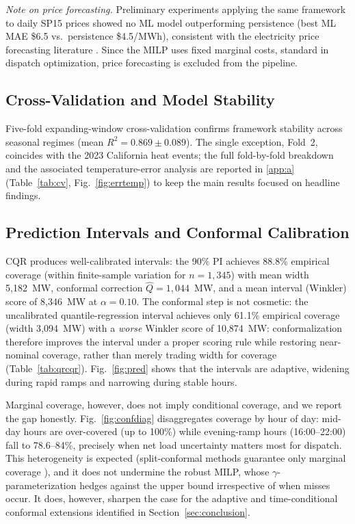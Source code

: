 \documentclass[preprint,12pt,authoryear]{elsarticle}
\begin{document}
\emph{Note on price forecasting.} Preliminary experiments applying the same framework to daily SP15 prices showed no ML model outperforming persistence (best ML MAE \$6.5 vs.\ persistence \$4.5/MWh), consistent with the electricity price forecasting literature \citep{weron2014,lago2021}. Since the MILP uses fixed marginal costs, standard in dispatch optimization, price forecasting is excluded from the pipeline.

\subsection{Cross-Validation and Model Stability}
\label{sec:results_cv}

Five-fold expanding-window cross-validation confirms framework stability across seasonal regimes (mean $R^2 = 0.869 \pm 0.089$). The single exception, Fold~2, coincides with the 2023 California heat events; the full fold-by-fold breakdown and the associated temperature-error analysis are reported in \ref{app:a} (Table~\ref{tab:cv}, Fig.~\ref{fig:errtemp}) to keep the main results focused on headline findings.

\subsection{Prediction Intervals and Conformal Calibration}
\label{sec:results_pi}

CQR produces well-calibrated intervals: the 90\% PI achieves 88.8\% empirical coverage (within finite-sample variation for $n = 1{,}345$) with mean width 5{,}182~MW, conformal correction $\hat{Q} = 1{,}044$~MW, and a mean interval (Winkler) score \citep{gneiting2007} of 8{,}346~MW at $\alpha = 0.10$. The conformal step is not cosmetic: the uncalibrated quantile-regression interval achieves only 61.1\% empirical coverage (width 3{,}094~MW) with a \emph{worse} Winkler score of 10{,}874~MW: conformalization therefore improves the interval under a proper scoring rule while restoring near-nominal coverage, rather than merely trading width for coverage (Table~\ref{tab:qrcqr}). Fig.~\ref{fig:pred} shows that the intervals are adaptive, widening during rapid ramps and narrowing during stable hours.

Marginal coverage, however, does not imply conditional coverage, and we report the gap honestly. Fig.~\ref{fig:confdiag} disaggregates coverage by hour of day: mid-day hours are over-covered (up to 100\%) while evening-ramp hours (16:00--22:00) fall to 78.6--84\%, precisely when net load uncertainty matters most for dispatch. This heterogeneity is expected (split-conformal methods guarantee only marginal coverage \citep{romano2019}), and it does not undermine the robust MILP, whose $\gamma$-parameterization hedges against the upper bound irrespective of when misses occur. It does, however, sharpen the case for the adaptive and time-conditional conformal extensions \citep{gibbs2021,zaffran2022} identified in Section~\ref{sec:conclusion}.
\end{document}
